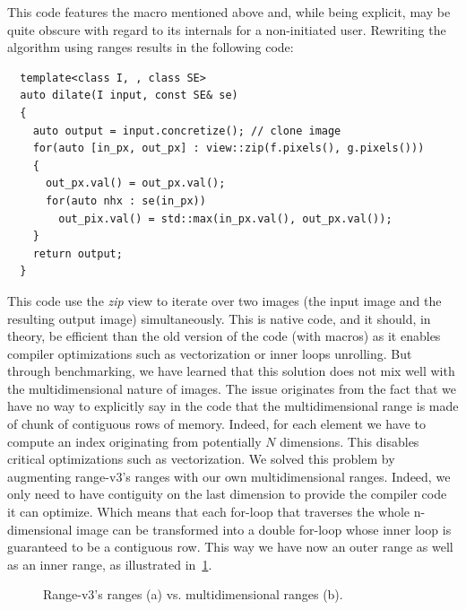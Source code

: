 This code features the macro mentioned above and, while being explicit, may be quite obscure with regard to its
internals for a non-initiated user. Rewriting the algorithm using ranges results in the following code:
\begin{verbatim}
  template<class I, , class SE>
  auto dilate(I input, const SE& se)
  {
    auto output = input.concretize(); // clone image
    for(auto [in_px, out_px] : view::zip(f.pixels(), g.pixels()))
    {
      out_px.val() = out_px.val();
      for(auto nhx : se(in_px))
        out_pix.val() = std::max(in_px.val(), out_px.val());
    }
    return output;
  }
\end{verbatim}
This code use the \emph{zip} view to iterate over two images (the input image and the resulting output image)
simultaneously. This is native code, and it should, in theory, be efficient than the old version of the code (with
macros) as it enables compiler optimizations such as vectorization or inner loops unrolling. But through benchmarking,
we have learned that this solution does not mix well with the multidimensional nature of images. The issue originates
from the fact that we have no way to explicitly say in the code that the multidimensional range is made of chunk of
contiguous rows of memory. Indeed, for each element we have to compute an index originating from potentially $N$
dimensions. This disables critical optimizations such as vectorization. We solved this problem by augmenting range-v3's
ranges with our own multidimensional ranges. Indeed, we only need to have contiguity on the last dimension to provide
the compiler code it can optimize. Which means that each for-loop that traverses the whole n-dimensional image can be
transformed into a double for-loop whose inner loop is guaranteed to be a contiguous row. This way we have now an outer
range as well as an inner range, as illustrated in~\cref{fig.inner.outer.range}.

\begin{figure}[htbp]
  \centering
  \caption{Range-v3's ranges (a) vs. multidimensional ranges (b).}
  \label{fig.inner.outer.range}
\end{figure}

